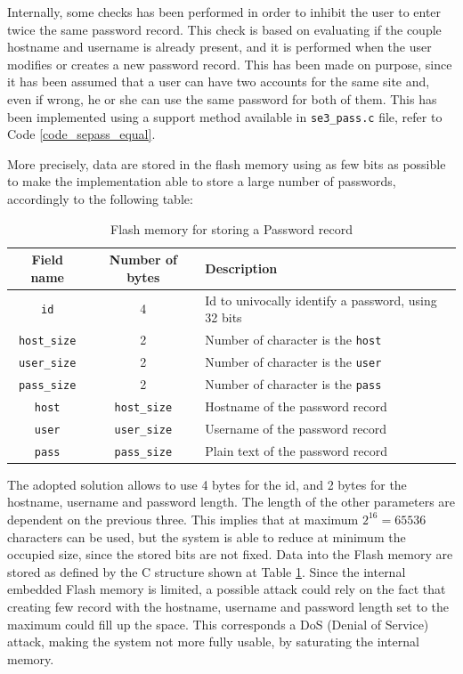 Internally, some checks has been performed in order to inhibit the user to enter twice the same password record. This check is based on evaluating if the couple hostname and username is already present, and it is performed when the user modifies or creates a new password record. This has been made on purpose, since it has been assumed that a user can have two accounts for the same site and, even if wrong, he or she can use the same password for both of them. This has been implemented using a support method available in \texttt{se3\_pass.c} file, refer to Code \ref{code_sepass_equal}.

More precisely, data are stored in the flash memory using as few bits as possible to make the implementation able to store a large number of passwords, accordingly to the following table:
\begin{table}[H]
	\begin{tabular}{ c c l }
		\textbf{Field name} & \textbf{Number of bytes} & \textbf{Description}\\ 
		\hline
		\texttt{id} & 4 & Id to univocally identify a password, using 32 bits\\ 
		\hline
		\texttt{host\_size} & 2 & Number of character is the \texttt{host} \\  
		\hline
		\texttt{user\_size} & 2 &  Number of character is the \texttt{user} \\  
		\hline
		\texttt{pass\_size} & 2 &  Number of character is the \texttt{pass} \\  
		\hline
		\texttt{host} & \texttt{host\_size} & Hostname of the password record \\  
		\hline
		\texttt{user} & \texttt{user\_size} & Username of the password record\\  
		\hline
		\texttt{pass} & \texttt{pass\_size} & Plain text of the password record\\  
		\hline
	\end{tabular}
	\caption{Flash memory for storing a Password record}
	\label{tab:flashmem_pass}
\end{table}

The adopted solution allows to use 4 bytes for the id, and 2 bytes for the hostname, username and password length. The length of the other parameters are dependent on the previous three. This implies that at maximum $2^{16} = 65536$ characters can be used, but the system is able to reduce at minimum the occupied size, since the stored bits are not fixed.\newline\newline
Data into the Flash memory are stored as defined by the C structure shown at Table \ref{tab:flashmem_pass}. Since the internal embedded Flash memory is limited, a possible attack could rely on the fact that creating few record with the hostname, username and password length set to the maximum could fill up the space. This corresponds a DoS (Denial of Service) attack, making the system not more fully usable, by saturating the internal memory.

